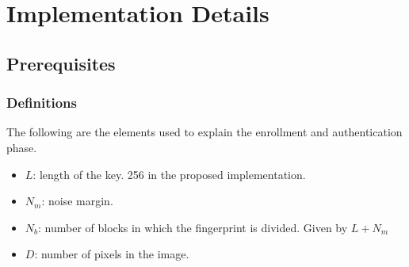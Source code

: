 \chapter{Implementation Details}

\section{Prerequisites}\label{sec:prerequisited}
\subsection{Definitions}\label{sec:label}
The following are the elements used to explain the enrollment and authentication phase.
\begin{itemize}
  \item $L$: length of the key. 256 in the proposed implementation.
  \item $N_{m}$: noise margin.
  \item $N_{b}$: number of blocks in which the fingerprint is divided. Given by $L + N_{m}$
  \item $D$: number of pixels in the image.
\end{itemize}

